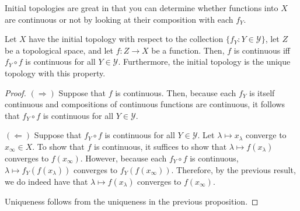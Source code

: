 Initial topologies are great in that you can determine whether functions into $X$ are continuous or not by looking at their composition with each $f_Y$.
\begin{prp}\label{prp3.4.6}
Let $X$ have the initial topology with respect to the collection $\{ f_Y:Y\in \mathcal{Y}\}$, let $Z$ be a topological space, and let $f:Z\rightarrow X$ be a function.  Then, $f$ is continuous iff $f_Y\circ f$ is continuous for all $Y\in \mathcal{Y}$.  Furthermore, the initial topology is the unique topology with this property.
\begin{proof}
$(\Rightarrow )$ Suppose that $f$ is continuous.  Then, because each $f_Y$ is itself continuous and compositions of continuous functions are continuous, it follows that $f_Y\circ f$ is continuous for all $Y\in \mathcal{Y}$.

\blankline
\noindent
$(\Leftarrow )$ Suppose that $f_Y\circ f$ is continuous for all $Y\in \mathcal{Y}$.  Let $\lambda \mapsto x_\lambda$ converge to $x_\infty \in X$.  To show that $f$ is continuous, it suffices to show that $\lambda \mapsto f(x_\lambda)$ converges to $f(x_\infty )$.  However, because each $f_Y\circ f$ is continuous, $\lambda \mapsto f_Y(f(x_\lambda ))$ converges to $f_Y(f(x_\infty ) )$.  Therefore, by the previous result, we do indeed have that $\lambda \mapsto f(x_\lambda)$ converges to $f(x_\infty )$.

\blankline
\noindent
Uniqueness follows from the uniqueness in the previous proposition.
\end{proof}
\end{prp}

